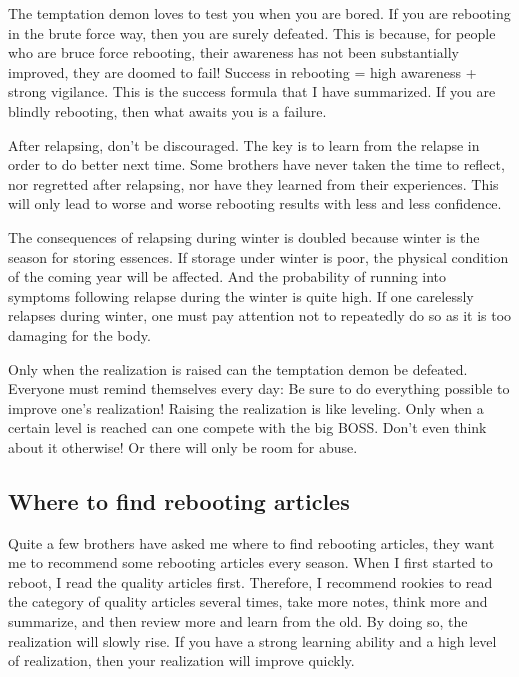 \documentclass[
]{book}
\begin{document}
The temptation demon loves to test you when you are bored. If you are rebooting in the brute force way, then you are surely defeated. This is because, for people who are bruce force rebooting, their awareness has not been substantially improved, they are doomed to fail! Success in rebooting = high awareness + strong vigilance. This is the success formula that I have summarized. If you are blindly rebooting, then what awaits you is a failure.

After relapsing, don't be discouraged. The key is to learn from the relapse in order to do better next time. Some brothers have never taken the time to reflect, nor regretted after relapsing, nor have they learned from their experiences. This will only lead to worse and worse rebooting results with less and less confidence.

The consequences of relapsing during winter is doubled because winter is the season for storing essences. If storage under winter is poor, the physical condition of the coming year will be affected. And the probability of running into symptoms following relapse during the winter is quite high. If one carelessly relapses during winter, one must pay attention not to repeatedly do so as it is too damaging for the body.

Only when the realization is raised can the temptation demon be defeated. Everyone must remind themselves every day: Be sure to do everything possible to improve one's realization! Raising the realization is like leveling. Only when a certain level is reached can one compete with the big BOSS. Don't even think about it otherwise! Or there will only be room for abuse.

\hypertarget{where-to-find-rebooting-articles}{%
\subsection{Where to find rebooting articles}\label{where-to-find-rebooting-articles}}

Quite a few brothers have asked me where to find rebooting articles, they want me to recommend some rebooting articles every season. When I first started to reboot, I read the quality articles first. Therefore, I recommend rookies to read the category of quality articles several times, take more notes, think more and summarize, and then review more and learn from the old. By doing so, the realization will slowly rise. If you have a strong learning ability and a high level of realization, then your realization will improve quickly.
\end{document}
